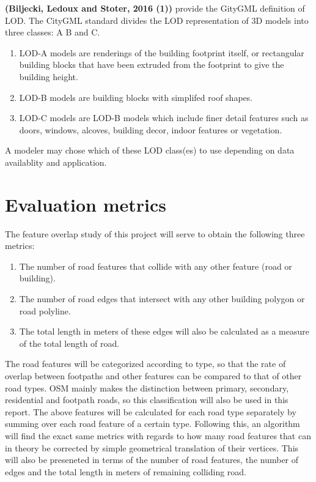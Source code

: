 \documentclass{kththesis}
\begin{document}
\textbf{(Biljecki, Ledoux and Stoter, 2016 (1))} provide the GityGML definition of LOD.
The CityGML standard divides the LOD representation of 3D models into three classes: A B and C.
\begin{enumerate}
    \item LOD-A models are renderings of the building footprint itself, or rectangular building blocks that have been extruded from the footprint to give the building height.
    \item LOD-B models are building blocks with simplifed roof shapes.
    \item LOD-C models are LOD-B models which include finer detail features such as doors, windows, alcoves, building decor, indoor features or vegetation.
\end{enumerate}
A modeler may chose which of these LOD class(es) to use depending on data availablity and application.

\section{Evaluation metrics}

The feature overlap study of this project will serve to obtain the following three metrics:

\begin{enumerate}
    \item The number of road features that collide with any other feature (road or building).
    \item The number of road edges that intersect with any other building polygon or road polyline.
    \item The total length in meters of these edges will also be calculated as a measure of the total length of road.
\end{enumerate}

The road features will be categorized according to type, so that the rate of overlap between footpaths and other features can be compared to that of other road types.
OSM mainly makes the distinction between primary, secondary, residential and footpath roads, so this classification will also be used in this report.
The above features will be calculated for each road type separately by summing over each road feature of a certain type.
Following this, an algorithm will find the exact same metrics with regards to how many road features that can in theory be corrected by simple geometrical translation of their vertices.
This will also be preseneted in terms of the number of road features, the number of edges and the total length in meters of remaining colliding road.
\end{document}
